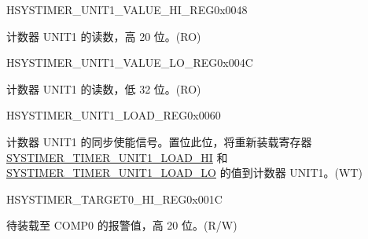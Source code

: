 \begin{register}{H}{SYSTIMER\_UNIT1\_VALUE\_HI\_REG}{0x0048}\label{regdesc:SYSTIMERUNIT1VALUEHIREG}
%
%
\regnewline%
\begin{regdesc}\begin{reglist}
\label{fielddesc:SYSTIMERTIMERUNIT1VALUEHI}\item [SYSTIMER\_TIMER\_UNIT1\_VALUE\_HI] 计数器 UNIT1 的读数，高 20 位。(RO)
\end{reglist}\end{regdesc}
\end{register}


\begin{register}{H}{SYSTIMER\_UNIT1\_VALUE\_LO\_REG}{0x004C}\label{regdesc:SYSTIMERUNIT1VALUELOREG}
%
\regnewline%
\begin{regdesc}\begin{reglist}
\label{fielddesc:SYSTIMERTIMERUNIT1VALUELO}\item [SYSTIMER\_TIMER\_UNIT1\_VALUE\_LO] 计数器 UNIT1 的读数，低 32 位。(RO)
\end{reglist}\end{regdesc}
\end{register}


\begin{register}{H}{SYSTIMER\_UNIT1\_LOAD\_REG}{0x0060}\label{regdesc:SYSTIMERUNIT1LOADREG}
%
%
\regnewline%
\begin{regdesc}\begin{reglist}
\label{fielddesc:SYSTIMERTIMERUNIT1LOAD}\item [SYSTIMER\_TIMER\_UNIT1\_LOAD] 计数器 UNIT1 的同步使能信号。置位此位，将重新装载寄存器 \hyperref[fielddesc:SYSTIMERTIMERUNIT1LOADHI]{SYSTIMER\_TIMER\_UNIT1\_LOAD\_HI} 和 \hyperref[fielddesc:SYSTIMERTIMERUNIT1LOADLO]{SYSTIMER\_TIMER\_UNIT1\_LOAD\_LO} 的值到计数器 UNIT1。(WT)
\end{reglist}\end{regdesc}
\end{register}


\begin{register}{H}{SYSTIMER\_TARGET0\_HI\_REG}{0x001C}\label{regdesc:SYSTIMERTARGET0HIREG}
%
%
\regnewline%
\begin{regdesc}\begin{reglist}
\label{fielddesc:SYSTIMERTIMERTARGET0HI}\item [SYSTIMER\_TIMER\_TARGET0\_HI] 待装载至 COMP0 的报警值，高 20 位。(R/W)
\end{reglist}\end{regdesc}
\end{register}


